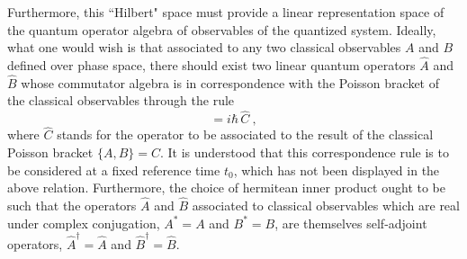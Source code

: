 \documentclass[a4paper,11pt]{article}
\begin{document}
Furthermore, this ``Hilbert" space must provide a linear representation
space of the quantum operator algebra of observables of the quantized
system. Ideally, what one would wish is that associated to any two
classical observables $A$ and $B$ defined over phase space, there should
exist two linear quantum operators $\hat{A}$ and $\hat{B}$ whose
commutator algebra is in correspondence with the Poisson bracket of the
classical observables through the rule
\begin{equation}
[\hat{A},\hat{B}]=i\hbar\,\hat{C}\ ,
\end{equation}
where $\hat{C}$ stands for the operator to be associated to
the result of the classical Poisson bracket $\{A,B\}=C$.
It is understood that this correspondence rule is to be considered at
a fixed reference time $t_0$, which has not been displayed in the
above relation. Furthermore, the choice of hermitean inner product
ought to be such that the operators $\hat{A}$ and $\hat{B}$ associated
to classical observables which are real under complex conjugation,
$A^*=A$ and $B^*=B$, are themselves self-adjoint operators,
$\hat{A}^\dagger=\hat{A}$ and $\hat{B}^\dagger=\hat{B}$.
\end{document}
